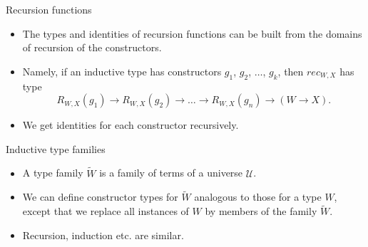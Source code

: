 \documentclass[10 pt., handout]{beamer}
\theoremstyle{plain}
\theoremstyle{remark}
\newcommand{\U}{\mathcal{U}}
\begin{document}
\begin{frame}{Recursion functions}

\begin{itemize}

\item The types and identities of recursion functions can be built from the domains of recursion of the constructors.

\item Namely, if an inductive type has constructors $g_1$, $g_2$, $\dots$, $g_k$, then $rec_{W, X}$ has type 
$$R_{W, X}(g_1) \to R_{W, X}(g_2) \to \dots \to R_{W, X}(g_n) \to (W \to X).$$

\item We get identities for each constructor recursively.

\end{itemize}

\end{frame}



\begin{frame}{Inductive type families}

\begin{itemize}

\item A type family $\tilde{W}$ is a family of terms of a universe $\U$.

\item We can define constructor types for $\tilde{W}$ analogous to those for a type $W$, except that we replace all instances of $W$ by members of the family $\tilde{W}$.

\item Recursion, induction etc. are similar.

\end{itemize}

\end{frame}
\end{document}

